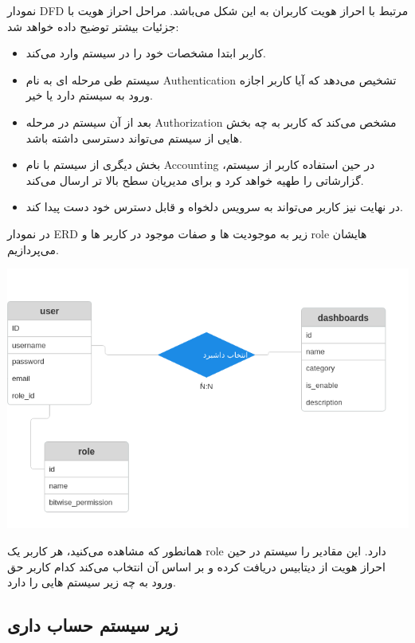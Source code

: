 نمودار DFD مرتبط با احراز هویت کاربران به این شکل می‌باشد.
مراحل احراز هویت با جزئیات بیشتر توضیح داده خواهد شد:

\begin{itemize}
	\item کاربر ابتدا مشخصات خود را در سیستم وارد می‌کند.
	\item سیستم طی مرحله ای به نام Authentication تشخیص می‌دهد که آیا کاربر اجازه ورود به سیستم دارد یا خیر.
	\item بعد از آن سیستم در مرحله Authorization مشخص می‌کند که کاربر به چه بخش هایی از سیستم می‌تواند دسترسی داشته باشد.
	\item بخش دیگری از سیستم با نام Accounting در حین استفاده کاربر از سیستم، گزارشاتی را طهیه خواهد کرد و برای مدیریان سطح بالا تر ارسال می‌کند.
	\item در نهایت نیز کاربر می‌تواند به سرویس دلخواه و قابل دسترس خود دست پیدا کند.
\end{itemize}

در نمودار ERD زیر به موجودیت ها و صفات موجود در کاربر ها و role هایشان می‌پردازیم.

\includegraphics[scale=0.8]{assets/auth_erd.png}

همانطور که مشاهده می‌کنید، هر کاربر یک role دارد. این مقادیر را سیستم در حین احراز هویت از دیتابیس دریافت کرده و بر اساس آن انتخاب می‌کند
کدام کاربر حق ورود به چه زیر سیستم هایی را دارد.

\subsection{زیر سیستم حساب داری}


